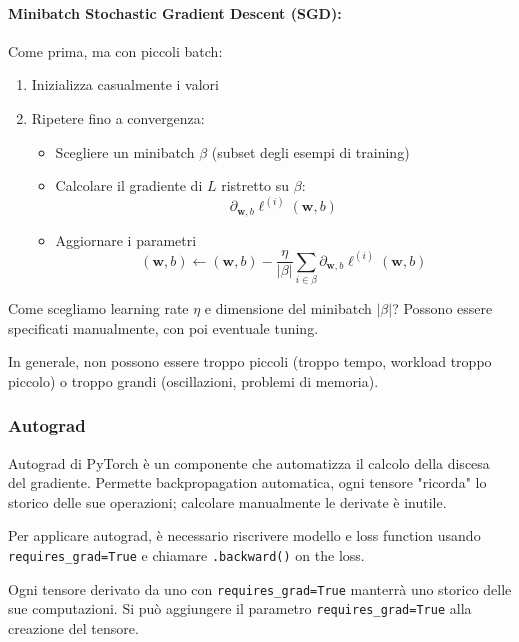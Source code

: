 \paragraph{Minibatch Stochastic Gradient Descent (SGD):} Come prima, ma con piccoli batch:
\begin{enumerate}
    \item Inizializza casualmente i valori
    
    \item Ripetere fino a convergenza:
    \begin{itemize}
        \item Scegliere un minibatch $\beta$ (subset degli esempi di training)
        
        \item Calcolare il gradiente di $L$ ristretto su $\beta$:
        $$ \partial_{\bm w, b} \ell^{(i)} (\bm w, b) $$
        
        \item Aggiornare i parametri 
        $$ (\bm w, b) \leftarrow (\bm w, b) - \frac{\eta}{|\beta|} \sum_{i \in \beta} \partial_{\bm w, b} \ell^{(i)} (\bm w, b) $$
    \end{itemize}
\end{enumerate}

Come scegliamo learning rate $\eta$ e dimensione del minibatch $|\beta|$? Possono essere specificati manualmente, con poi eventuale tuning. 

In generale, non possono essere troppo piccoli (troppo tempo, workload troppo piccolo) o troppo grandi (oscillazioni, problemi di memoria).

\subsubsection{Autograd}

Autograd di PyTorch è un componente che automatizza il calcolo della discesa del gradiente. Permette backpropagation automatica, ogni tensore "ricorda" lo storico delle sue operazioni; calcolare manualmente le derivate è inutile.

Per applicare autograd, è necessario riscrivere modello e loss function usando \texttt{requires\_grad=True} e chiamare \texttt{.backward()} on the loss.

Ogni tensore derivato da uno con \texttt{requires\_grad=True} manterrà uno storico delle sue computazioni. Si può aggiungere il parametro \texttt{requires\_grad=True} alla creazione del tensore.

